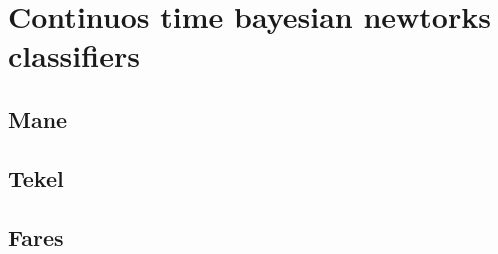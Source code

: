 
\chapter{Continuos time bayesian newtorks classifiers}
\label{cap:ctbnc}

\lipsum[1]

\section{Mane}
\lipsum[2]

\section{Tekel}
\lipsum[3]

\section{Fares}
\lipsum[4-5]
